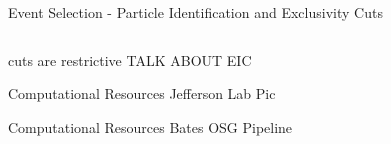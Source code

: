 \documentclass[aspectratio=169]{beamer}
\begin{document}
\begin{frame}{Event Selection - Particle Identification and Exclusivity Cuts}
\begin{columns}[c]
\begin{column}{0.65\textwidth}
\begin{columns}[t, onlytextwidth]
                	


        \end{columns}
        \end{column}   
        \end{columns}
\end{frame}

\begin{frame}
    cuts are restrictive
    TALK ABOUT EIC
\end{frame}

\begin{frame}{Computational Resources}
    Jefferson Lab Pic
\end{frame}

\begin{frame}{Computational Resources}
    Bates OSG Pipeline
\end{frame}
\end{document}
